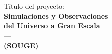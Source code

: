 \section*{}
\begin{center}
{\LARGE T\'itulo del proyecto: \\ {\bf Simulaciones y Observaciones \\del Universo a Gran Escala}\\ --- \\{\bf (SOUGE)}} 
\end{center}
